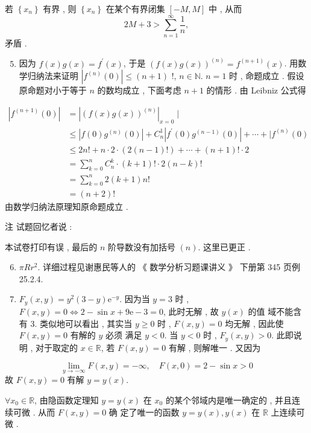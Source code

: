 \documentclass[10pt]{article}
\begin{document}
 若  $\left\{x_{n}\right\}$  有界 ,  则  $\left\{x_{n}\right\}$  在某个有界闭集  $[-M, M]$  中 ,  从而 
$$
2 M+3>\sum_{n=1}^{\infty} \frac{1}{n},
$$
 矛盾 .

\begin{enumerate}
  \setcounter{enumi}{4}
  \item  因为  $f(x) g(x)=f^{\prime}(x)$,  于是  $(f(x) g(x))^{(n)}=f^{(n+1)}(x)$.  用数学归纳法来证明  $\left|f^{(n)}(0)\right| \leqslant(n+1)$ !, $n \in \mathbb{N}$. $n=1$  时 ,  命题成立 .  假设原命题对小于等于  $n$  的数均成立 ,  下面考虑  $n+1$  的情形 .  由  Leibniz  公式得 
\end{enumerate}
$$
\begin{aligned}
\left|f^{(n+1)}(0)\right| &=\left|(f(x) g(x))^{(n)}\right|_{x=0} \mid \\
& \leqslant\left|f(0) g^{(n)}(0)\right|+C_{n}^{1}\left|f^{\prime}(0) g^{(n-1)}(0)\right|+\cdots+\mid f^{(n)}(0) \\
& \leqslant 2 n !+n \cdot 2 \cdot(2(n-1) !)+\cdots+(n+1) ! \cdot 2 \\
&=\sum_{k=0}^{n} C_{n}^{k} \cdot(k+1) ! \cdot 2(n-k) ! \\
&=\sum_{k=0}^{n} 2(k+1) n ! \\
&=(n+2) !
\end{aligned}
$$
 由数学归纳法原理知原命题成立 .

 注   试题回忆者说 :

 本试卷打印有误 ,  最后的  $n$  阶导数没有加括号  $(n)$.  这里已更正 .

\begin{enumerate}
  \setcounter{enumi}{5}
  \item $\pi R r^{2}$.  详细过程见谢惠民等人的 《 数学分析习题课讲义 》 下册第  345  页例  25.2.4.

  \item $F_{y}(x, y)=y^{2}(3-y) \mathrm{e}^{-y}$.  因为当  $y=3$  时 , $F(x, y)=0 \Longleftrightarrow 2-\sin x+9 \mathrm{e}-3=0$,  此时无解 ,  故  $y(x)$  的值   域不能含有  3.  类似地可以看出 ,  其实当  $y \geqslant 0$  时 , $F(x, y)=0$  均无解 ,  因此使  $F(x, y)=0$  有解的  $y$  必须   满足  $y<0$.  当  $y<0$  时 , $F_{y}(x, y)>0$.  此即说明 ,  对于取定的  $x \in \mathbb{R}$,  若  $F(x, y)=0$  有解 ,  则解唯一 .  又因为 

\end{enumerate}
$$
\lim _{y \rightarrow-\infty} F(x, y)=-\infty, \quad F(x, 0)=2-\sin x>0
$$
 故  $F(x, y)=0$  有解  $y=y(x)$.

$\forall x_{0} \in \mathbb{R}$,  由隐函数定理知  $y=y(x)$  在  $x_{0}$  的某个邻域内是唯一确定的 ,  并且连续可微 .  从而  $F(x, y)=0$  确   定了唯一的函数  $y=y(x), y(x)$  在  $\mathbb{R}$  上连续可微 .
\end{document}

